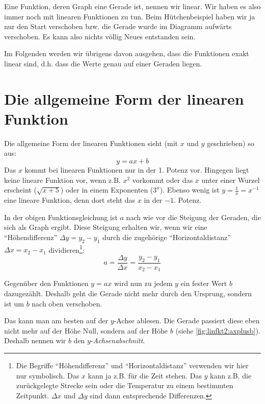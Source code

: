 \documentclass[%
11pt,%
twoside,%
titlepage,%
german,%
headsepline%
]{scrartcl}
\newcommand{\quasi}[1]{``#1''}
\begin{document}
{Eine Funktion, deren Graph eine Gerade ist, nennen wir linear. Wir haben es also immer noch mit linearen Funktionen zu tun. Beim H\"utchenbeispiel haben wir ja nur den Start verschoben bzw. die Gerade wurde im Diagramm aufw\"arts verschoben. Es kann also nichts v\"ollig Neues entstanden sein.

Im Folgenden werden wir \"ubrigens davon ausgehen, dass die Funktionen exakt linear sind, d.h. dass die Werte genau auf einer Geraden liegen.


\section{Die allgemeine Form der linearen Funktion}
\label{linfkt2:allgform}

Die allgemeine Form der linearen Funktionen sieht (mit $x$ und $y$ geschrieben) so aus:
\begin{displaymath}
  y=ax+b
\end{displaymath}
Das $x$ kommt bei linearen Funktionen nur in der 1. Potenz vor. Hingegen liegt keine lineare Funktion vor, wenn z.B. $x^2$ vorkommt oder das $x$ unter einer Wurzel erscheint ($\sqrt{x+5}$) oder in einem Exponenten ($3^x$). Ebenso wenig ist $y=\frac{1}{x}=x^{-1}$ eine lineare Funktion, denn dort steht das $x$ in der $-1.$ Potenz.

In der obigen Funktionsgleichung ist $a$ nach wie vor die Steigung der Geraden, die sich als Graph ergibt. Diese Steigung erhalten wir, wenn wir eine \quasi{H\"ohendifferenz} $\Delta y=y_2-y_1$ durch die zugeh\"orige \quasi{Horizontaldistanz} $\Delta x = x_2-x_1$ dividieren\footnote{Die Begriffe \quasi{H\"ohendifferenz} und \quasi{Horizontaldistanz} verwenden wir hier nur symbolisch. Das $x$ kann ja z.B. f\"ur die Zeit stehen. Das $y$ kann z.B. die zur\"uckgelegte Strecke sein oder die Temperatur zu einem bestimmten Zeitpunkt. $\Delta x$ und $\Delta y$ sind dann entsprechende Differenzen.}:
\begin{displaymath}
  a=\frac{\Delta y}{\Delta x} = \frac{y_2 - y_1}{x_2 - x_1}
\end{displaymath}

Gegen\"uber den Funktionen $y=ax$ wird nun zu jedem $y$ ein fester Wert $b$ dazugez\"ahlt. Deshalb geht die Gerade nicht mehr durch den Ursprung, sondern ist um $b$ nach oben verschoben.

Das kann man am besten auf der $y$-Achse ablesen. Die Gerade passiert diese eben nicht mehr auf der H\"ohe Null, sondern auf der H\"ohe $b$ (siehe \ref{fig:linfkt2:axplusb}). Deshalb nennen wir $b$ den $y$-\emph{Achsenabschnitt}.

}
\end{document}
